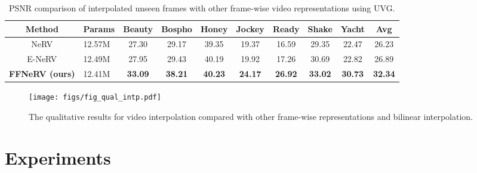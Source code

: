 \documentclass[sigconf]{acmart}
\begin{document}
\begin{table*}[]
\caption{PSNR comparison of interpolated unseen frames with other frame-wise video representations using UVG.}
\vskip 0.15in
\centering
\begin{tabular}{c|l||ccccccc||c}
\hline
Method       & Params & Beauty & Bospho & Honey & Jockey & Ready & Shake & Yacht & Avg   \\ \hline\hline
NeRV   & 12.57M          & 27.30           & 29.17           & 39.35          & 19.37           & 16.59          & 29.35          & 22.47          & 26.23 \\ \hline
E-NeRV & 12.49M          & 27.95           & 29.43           & 40.19          & 19.92           & 17.26          & 30.69          & 22.82          & 26.89 \\ \hline
\textbf{FFNeRV (ours)}   & 12.41M          & \textbf{33.09}           & \textbf{38.21}           & \textbf{40.23}          & \textbf{24.17}           & \textbf{26.92}          & \textbf{33.02}          & \textbf{30.73}          & \textbf{32.34} \\ \hline
\end{tabular}
\label{tab_intp}
\end{table*}

\begin{figure*}[ht]
\begin{center}
\texttt{[image: figs/fig\_qual\_intp.pdf]}
\end{center}
  \caption{The qualitative results for video interpolation compared with other frame-wise representations and bilinear interpolation.}
\label{fig_qual_intp}
\end{figure*}




\section{Experiments}
\end{document}
